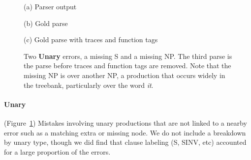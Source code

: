 \begin{figure}
\begin{center}

\vspace{3mm}
(a) Parser output

\vspace{6mm}


\vspace{3mm}
(b) Gold parse

\vspace{6mm}


\vspace{3mm}
(c) Gold parse with traces and function tags
\end{center}
\derivspace
\caption[Error analysis example: unary.]{ \label{fig:unary} 
	Two \textbf{Unary} errors, a missing S and a missing NP.  The third parse is
	the \ptb parse before traces and function tags are removed.  Note that the
	missing NP is over another NP, a production that occurs widely in the
	treebank, particularly over the word \emph{it}.
}
\derivaftercompress
\end{figure}

\paragraph{Unary} (Figure~\ref{fig:unary}) 
Mistakes involving unary productions that are not linked to a nearby error  such as a matching extra or missing node.
We do not include a breakdown by unary type, though we did find that clause labeling (S, SINV, etc) accounted for a large proportion of the errors.

